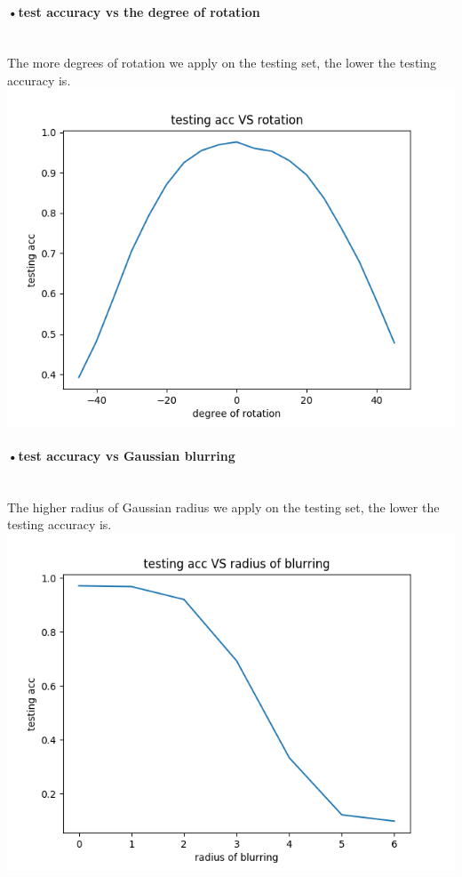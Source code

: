 \documentclass[11pt]{article} %
\begin{document}
\paragraph{•test accuracy vs the degree of rotation}\mbox{}\\
The more degrees of rotation we apply on the testing set, the lower the testing accuracy is. \\
\includegraphics[scale=0.7]{e131.png}
\paragraph{•test accuracy vs Gaussian blurring}\mbox{}\\
The higher radius of Gaussian radius we apply on the testing set, the lower the testing accuracy is.\\
\includegraphics[scale=0.5]{e132.png}
\end{document}
